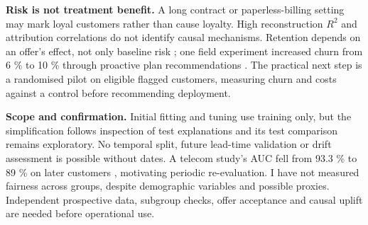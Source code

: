 \documentclass[10pt,a4paper]{article}
\begin{document}
\textbf{Risk is not treatment benefit.} A long contract or
paperless-billing setting may mark loyal customers rather than cause
loyalty. High reconstruction \(R^2\) and attribution correlations do not
identify causal mechanisms. Retention depends on an offer's effect, not
only baseline risk \cite{ascarza2018}; one field experiment increased churn from 6
\% to 10 \% through proactive plan recommendations \cite{ascarza2016}. The
practical next step is a randomised pilot on eligible flagged customers,
measuring churn and costs against a control before recommending
deployment.

\textbf{Scope and confirmation.} Initial fitting and tuning use training
only, but the simplification follows inspection of test explanations and
its test comparison remains exploratory. No temporal split, future
lead-time validation or drift assessment is possible without dates. A
telecom study's AUC fell from 93.3 \% to 89 \% on later customers
\cite{ahmad2019}, motivating periodic re-evaluation. I have not measured
fairness across groups, despite demographic variables and possible
proxies. Independent prospective data, subgroup checks, offer acceptance
and causal uplift are needed before operational use.
\end{document}
